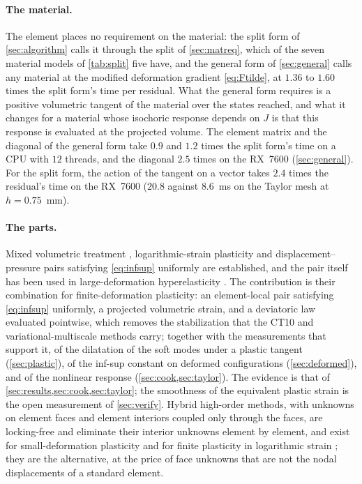 \documentclass{article}
\theoremstyle{definition}
\theoremstyle{plain}
\begin{document}
\paragraph{The material.} The element places no requirement on the
material: the split form of \cref{sec:algorithm} calls it through the
split of \cref{sec:matreq}, which of the seven material models of
\cref{tab:split} five have, and the general form of
\cref{sec:general} calls any material at the modified deformation gradient
\eqref{eq:Ftilde}, at $1.36$ to $1.60$ times the split form's time per
residual. What the general form requires is a positive volumetric tangent
of the material over the states reached, and what it changes for a
material whose isochoric response depends on $J$ is that this response is
evaluated at the projected volume. The element matrix and the
diagonal of the general form take $0.9$ and $1.2$ times the split form's
time on a CPU with $12$ threads, and the diagonal $2.5$ times on the
RX~7600 (\cref{sec:general}). For the split form, the
action of the tangent on a vector takes $2.4$ times the residual's time on
the RX~7600 ($20.8$ against $8.6$~ms on the Taylor mesh at $h = 0.75$~mm).

\paragraph{The parts.} Mixed volumetric treatment
\cite{SimoTaylorPister:1985}, logarithmic-strain plasticity
\cite{Miehe.Apel.Lambrecht:2002} and displacement--pressure pairs satisfying
\eqref{eq:infsup} uniformly \cite{BoffiBrezziFortin:2013} are established,
and the pair itself has been used in large-deformation hyperelasticity
\cite{ChamberlandFortinFortin:2010}. The contribution is their combination
for finite-deformation plasticity: an element-local pair satisfying
\eqref{eq:infsup} uniformly, a projected volumetric strain, and a deviatoric
law evaluated pointwise, which removes the stabilization that the
CT10 and variational-multiscale methods carry; together
with the measurements that support it, of the dilatation of the soft modes
under a plastic tangent (\cref{sec:plastic}), of the inf-sup constant on
deformed configurations (\cref{sec:deformed}), and of the nonlinear
response (\cref{sec:cook,sec:taylor}). The evidence is that of \cref{sec:results,sec:cook,sec:taylor}; the smoothness of the equivalent plastic strain is the
open measurement of \cref{sec:verify}. Hybrid high-order methods, with
unknowns on element faces and element interiors coupled only through the
faces, are locking-free and eliminate their interior unknowns element by
element, and exist for small-deformation plasticity
\cite{AbbasErnPignet:2019} and for finite plasticity in logarithmic strain
\cite{AbbasErnPignet:2019b}; they are the alternative, at the price of
face unknowns that are not the nodal displacements of a standard element.

\printbibliography
\end{document}
